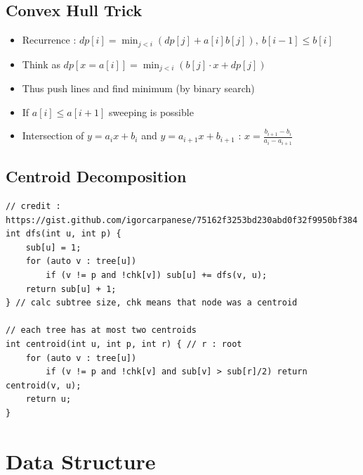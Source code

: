 \documentclass[landscape, 8pt, a4paper, oneside, twocolumn]{extarticle}
\begin{document}
\subsection{Convex Hull Trick}
\begin{itemize}
\item Recurrence : $ dp[i] = \min_{j<i} (dp[j] + a[i]b[j]),\ b[i-1] \leq b[i] $
\item Think as $ dp[x = a[i]] = \min_{j<i}(b[j] \cdot x + dp[j]) $
\item Thus push lines and find minimum (by binary search)
\item If $ a[i] \leq a[i+1] $ sweeping is possible
\item Intersection of $ y = a_ix +b_i $ and $ y = a_{i+1}x + b_{i+1} $ : $ x = \frac{b_{i+1}-b_i}{a_i-a_{i+1}} $
\end{itemize}

\subsection{Centroid Decomposition}
\begin{verbatim}
// credit : https://gist.github.com/igorcarpanese/75162f3253bd230abd0f32f9950bf384
int dfs(int u, int p) {
    sub[u] = 1;
    for (auto v : tree[u])
        if (v != p and !chk[v]) sub[u] += dfs(v, u);
    return sub[u] + 1;
} // calc subtree size, chk means that node was a centroid

// each tree has at most two centroids
int centroid(int u, int p, int r) { // r : root
    for (auto v : tree[u])
        if (v != p and !chk[v] and sub[v] > sub[r]/2) return centroid(v, u);
    return u;
}
\end{verbatim}

\section{Data Structure}
\end{document}
